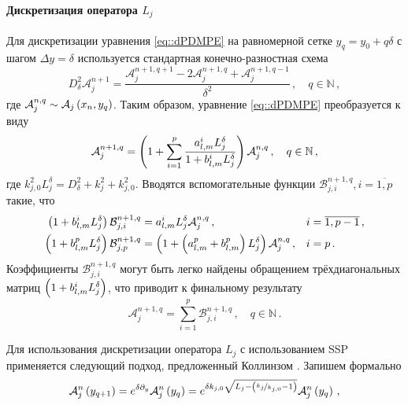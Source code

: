 \documentclass[../document.tex]{subfiles}
\begin{document}
            \paragraph{Дискретизация оператора $L_j$}
                \par Для дискретизации уравнения \eqref{eq::dPDMPE} на равномерной сетке $y_q=y_0+q\delta$ с шагом $\Delta y=\delta$ используется стандартная конечно-разностная схема
                \begin{equation}
                    D_\delta^2\mathcal{A}_j^{n+1}=\frac{\mathcal{A}_j^{n+1,q+1}-2\mathcal{A}_j^{n+1,q}+\mathcal{A}_j^{n+1,q-1}}{\delta^2}\,,\quad q\in\mathbb{N}\,,
                \end{equation}
                где $\mathcal{A}_j^{n,q}\sim\mathcal{A}_j\left(x_n,y_q\right)$. Таким образом, уравнение \eqref{eq::dPDMPE} преобразуется к виду
                \begin{equation}\label{eq::ddPDMPE}
                    \mathcal{A}_j^{n+1,q}=\left(1+\sum\limits_{i=1}^p\frac{a_{l,m}^iL_j^\delta}{1+b_{l,m}^iL_j^\delta}\right)\mathcal{A}_j^{n,q}\,,\quad q\in\mathbb{N}\,,
                \end{equation}
                где $k_{j,0}^2L_j^\delta=D_\delta^2+k_j^2+k_{j,0}^2$. Вводятся вспомогательные функции $\mathcal{B}_{j,i}^{n+1,q},i=\overline{1,p}$ такие, что 
                \begin{align}
                    \left(1+b_{l,m}^iL_j^\delta\right)\mathcal{B}_{j,i}^{n+1,q}&=a_{l,m}^iL_j^\delta\mathcal{A}_j^{n,q}\,,&&i=\overline{1,p-1}\,,\\
                    \left(1+b_{l,m}^pL_j^\delta\right)\mathcal{B}_{j,p}^{n+1,q}&=\left(1+\left(a_{l,m}^p+b_{l,m}^p\right)L_j^\delta\right)\mathcal{A}_j^{n,q}\,,&&i=p\,.
                \end{align}
                Коэффициенты $\mathcal{B}_{j,i}^{n+1,q}$ могут быть легко найдены обращением трёхдиагональных матриц $\left(1+b_{l,m}^iL_j^\delta\right)$, что  приводит к финальному результату
                \begin{equation}
                    \mathcal{A}_j^{n+1,q}=\sum\limits_{i=1}^p\mathcal{B}_{j,i}^{n+1,q}\,,\quad q\in\mathbb{N}\,.
                \end{equation}
                \par Для использования дискретизации оператора $L_j$ с использованием SSP применяется следующий подход, предложенный Коллинзом \cite{collins}. Запишем формально 
                \begin{equation}
                    \mathcal{A}_j^n\left(y_{q+1}\right)=e^{\delta\partial_y}\mathcal{A}_j^n\left(y_q\right)=e^{\delta k_{j,0}\sqrt{L_j-\left(\nicefrac{k_j}{k_{j,0}}-1\right)}}\mathcal{A}_j^n\left(y_q\right)\,,
                \end{equation}
\end{document}
